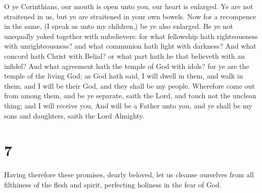 O ye Corinthians, our mouth is open unto you, our heart
is enlarged.  Ye are not straitened in us, but ye are
straitened in your own bowels.  Now for a recompence in
the same, (I speak as unto my children,) be ye also enlarged.
 Be ye not unequally yoked together with unbelievers: for
what fellowship hath righteousness with unrighteousness? and what
communion hath light with darkness?  And what concord
hath Christ with Belial? or what part hath he that believeth with an
infidel?  And what agreement hath the temple of God with
idols? for ye are the temple of the living God; as God hath said, I will
dwell in them, and walk in them; and I will be their God, and they shall
be my people.  Wherefore come out from among them, and be
ye separate, saith the Lord, and touch not the unclean thing; and I will
receive you,  And will be a Father unto you, and ye shall
be my sons and daughters, saith the Lord Almighty.

\hypertarget{section-6}{%
\section{7}\label{section-6}}

 Having therefore these promises, dearly beloved, let us
cleanse ourselves from all filthiness of the flesh and spirit,
perfecting holiness in the fear of God.


